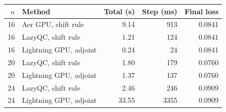 \begin{tabular}{rlrrr}
\toprule
$n$ & Method & Total (s) & Step (ms) & Final loss\\
\midrule
16 & Aer GPU, shift rule & 9.14 & 913 & 0.0841\\
16 & LazyQC, shift rule & 1.21 & 124 & 0.0841\\
16 & Lightning GPU, adjoint & 0.24 & 24 & 0.0841\\
20 & LazyQC, shift rule & 1.80 & 179 & 0.0760\\
20 & Lightning GPU, adjoint & 1.37 & 137 & 0.0760\\
24 & LazyQC, shift rule & 2.46 & 246 & 0.0909\\
24 & Lightning GPU, adjoint & 33.55 & 3355 & 0.0909\\
\bottomrule
\end{tabular}
